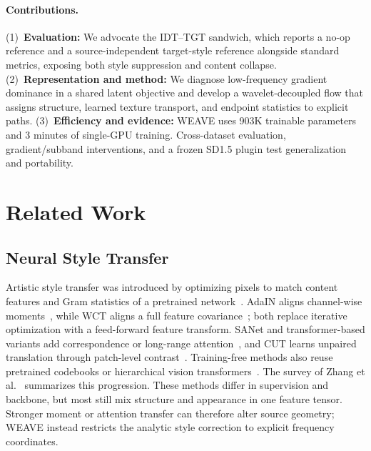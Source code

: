 \documentclass[letterpaper]{article}
\begin{document}
\paragraph{Contributions.}
(1)~\textbf{Evaluation:} We advocate the IDT--TGT sandwich, which reports a no-op reference
and a source-independent target-style reference alongside standard metrics, exposing both
style suppression and content collapse.
(2)~\textbf{Representation and method:} We diagnose low-frequency gradient dominance in a
shared latent objective and develop a wavelet-decoupled flow that assigns structure,
learned texture transport, and endpoint statistics to explicit paths.
(3)~\textbf{Efficiency and evidence:} WEAVE uses 903K trainable parameters and 3 minutes of
single-GPU training. Cross-dataset evaluation, gradient/subband interventions, and a frozen
SD1.5 plugin test generalization and portability.

\section{Related Work}
\label{sec:related}

\subsection{Neural Style Transfer}
\label{sec:rw-nst}
Artistic style transfer was introduced by optimizing pixels to match content features and
Gram statistics of a pretrained network~\cite{gatys2015neural,gatys2016image}. AdaIN
aligns channel-wise moments~\cite{huang2017arbitrary}, while WCT aligns a full feature
covariance~\cite{li2017universal}; both replace iterative optimization with a feed-forward
feature transform. SANet and transformer-based variants add correspondence or long-range
attention~\cite{park2019sanet,deng2022stytr2,hong2023aespa,kwon2024aesfa}, and CUT learns
unpaired translation through patch-level contrast~\cite{park2020cut}. Training-free methods
also reuse pretrained codebooks or hierarchical vision transformers~\cite{gim2024cast,zhang2024s2wat}.
The survey of Zhang et al.~\cite{zhang2025survey} summarizes this progression. These methods
differ in supervision and backbone, but most still mix structure and appearance in one
feature tensor. Stronger moment or attention transfer can therefore alter source geometry;
WEAVE instead restricts the analytic style correction to explicit frequency coordinates.
\end{document}
